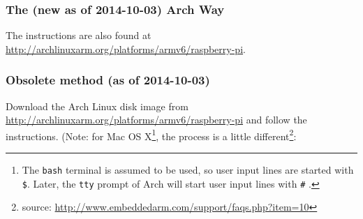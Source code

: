 \documentclass[12pt,letterpaper]{article}
\begin{document}
\subsubsection{The (new as of 2014-10-03) Arch Way}
The instructions are also found at \url{http://archlinuxarm.org/platforms/armv6/raspberry-pi}.

\subsubsection{Obsolete method (as of 2014-10-03)}
Download the Arch Linux disk image from \url{http://archlinuxarm.org/platforms/armv6/raspberry-pi} and follow the instructions.
(Note: for Mac OS X\footnote{The \lstinline{bash} terminal is assumed to be used, so user input lines are started with \lstinline{$}.  Later, the \lstinline{tty} prompt of Arch will start user input lines with \lstinline{#}%
.}, the process is a little different\footnote{source: \url{http://www.embeddedarm.com/support/faqs.php?item=10}}:
\end{document}
